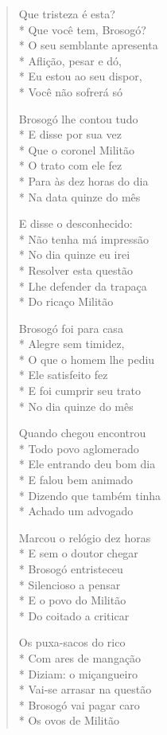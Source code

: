 \begin{verse}
Que tristeza é esta?\\*
Que você tem, Brosogó?\\*
O seu semblante apresenta\\*
Aflição, pesar e dó,\\*
Eu estou ao seu dispor,\\*
Você não sofrerá só

Brosogó lhe contou tudo\\*
E disse por sua vez\\*
Que o coronel Militão\\*
O trato com ele fez\\*
Para às dez horas do dia\\*
Na data quinze do mês

E disse o desconhecido:\\*
Não tenha má impressão\\*
No dia quinze eu irei\\*
Resolver esta questão\\*
Lhe defender da trapaça\\*
Do ricaço Militão

Brosogó foi para casa\\*
Alegre sem timidez,\\*
O que o homem lhe pediu\\*
Ele satisfeito fez\\*
E foi cumprir seu trato\\*
No dia quinze do mês

Quando chegou encontrou\\*
Todo povo aglomerado\\*
Ele entrando deu bom dia\\*
E falou bem animado\\*
Dizendo que também tinha\\*
Achado um advogado

Marcou o relógio dez horas\\*
E sem o doutor chegar\\*
Brosogó entristeceu\\*
Silencioso a pensar\\*
E o povo do Militão\\*
Do coitado a criticar

Os puxa-sacos do rico\\*
Com ares de mangação\\*
Diziam: o miçangueiro\\*
Vai-se arrasar na questão\\*
Brosogó vai pagar caro\\*
Os ovos de Militão


\end{verse}
